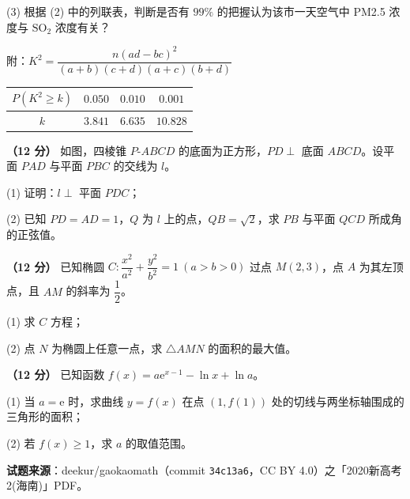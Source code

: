   (3) 根据 (2) 中的列联表，判断是否有 $99\%$ 的把握认为该市一天空气中 PM2.5 浓度与 $\mathrm{SO_2}$ 浓度有关？

  附：$K^{2}=\dfrac{n(ad-bc)^{2}}{(a+b)(c+d)(a+c)(b+d)}$

\begin{center}
\begin{tabular}{cccc}
\toprule
$P\left(K^{2}\ge k\right)$ & $0.050$ & $0.010$ & $0.001$ \\
\midrule
$k$ & $3.841$ & $6.635$ & $10.828$ \\
\bottomrule
\end{tabular}
\end{center}

\textbf{（12 分）} 如图，四棱锥 $P\text{-}ABCD$ 的底面为正方形，$PD\perp$ 底面 $ABCD$。设平面 $PAD$ 与平面 $PBC$ 的交线为 $l$。

\begin{center}\end{center}

  (1) 证明：$l\perp$ 平面 $PDC$；

  (2) 已知 $PD=AD=1$，$Q$ 为 $l$ 上的点，$QB=\sqrt2$，求 $PB$ 与平面 $QCD$ 所成角的正弦值。

\textbf{（12 分）} 已知椭圆 $C:\dfrac{x^{2}}{a^{2}}+\dfrac{y^{2}}{b^{2}}=1\ (a>b>0)$ 过点 $M(2,3)$，点 $A$ 为其左顶点，且 $AM$ 的斜率为 $\dfrac12$。

  (1) 求 $C$ 方程；

  (2) 点 $N$ 为椭圆上任意一点，求 $\triangle AMN$ 的面积的最大值。

\textbf{（12 分）} 已知函数 $f(x)=a\mathrm e^{x-1}-\ln x+\ln a$。

  (1) 当 $a=\mathrm e$ 时，求曲线 $y=f(x)$ 在点 $(1,f(1))$ 处的切线与两坐标轴围成的三角形的面积；

  (2) 若 $f(x)\ge1$，求 $a$ 的取值范围。

\par\medskip

\begin{gktip}
\textbf{试题来源}：deekur/gaokaomath（commit \texttt{34c13a6}，CC BY 4.0）之「2020新高考2(海南)」PDF。
\end{gktip}
